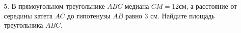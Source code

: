 5. В прямоугольном треугольнике $ABC$ медиана $CM=12$см, а расстояние от середины катета $AC$ до гипотенузы $AB$ равно 3 см. Найдите площадь треугольника $ABC.$\\
